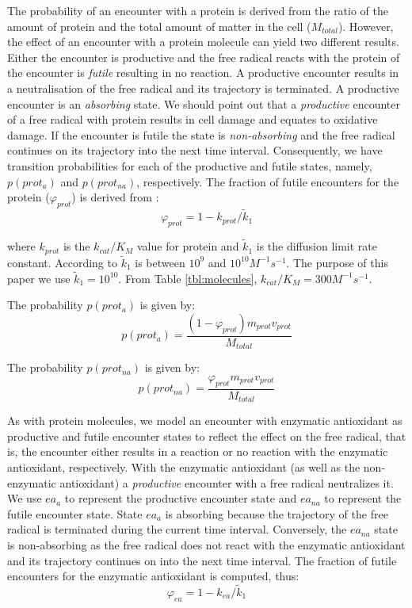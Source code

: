 \documentclass[preprint,12pt,authoryear]{elsarticle}
\begin{document}
The probability of an encounter with a protein is derived from the ratio
of the amount of protein and the total amount of matter in the cell ($M_{total}$).  
However, the effect of an encounter
with a protein molecule can yield two different results. Either the encounter is
productive and the free radical reacts with the protein of the encounter is \emph{futile}
resulting in no reaction.
A productive encounter results in a neutralisation of the
free radical  and its trajectory is terminated.
A productive encounter is an \emph{absorbing} state.
We should point out that a \emph{productive} encounter of a free radical with 
protein results in cell damage and equates to oxidative damage.
If the encounter is futile the state is \emph{non-absorbing}
and the free radical continues on its trajectory into the next time interval.
Consequently, we have transition probabilities for each of the productive and futile states, namely,
$p(prot_a)$ and $p(prot_{na})$, respectively.
The fraction of futile encounters for the protein ($\varphi_{prot}$) is derived from \citet{barevan:2015uy}:
%
\begin{equation}
\varphi_{prot} = 1 - k_{prot}/\tilde{k}_1
\end{equation}

{\parindent0pt
where $k_{prot}$ is the $k_{cat}/K_M$  value for protein 
and $\tilde{k}_1$ is the diffusion limit rate constant. According to 
\citet{barevan:2015uy} $\tilde{k}_1$ is between $10^{9}$ and $10^{10} M^{-1}s^{-1}$.
The purpose of this paper we use $\tilde{k}_1 = 10^{10}$.
From Table \ref{tbl:molecules},  $k_{cat}/K_M = 300 M^{-1}s^{-1}$.
}



%
The probability $p(prot_a)$ is given by:
%
\begin{equation}
p(prot_a) =  
\frac{ (1-\varphi_{prot}) m_{prot} v_{prot} } { M_{total } }
\end{equation}

The probability $p(prot_{na})$ is given by:
%
\begin{equation}
p(prot_{na}) = 
\frac{ \varphi_{prot} m_{prot} v_{prot} } { M_{total}  }
\end{equation}

As with protein molecules,
we model an encounter with enzymatic antioxidant as productive and futile encounter states to reflect the effect
on the free radical, that is, the encounter either results in a reaction or no reaction with the enzymatic antioxidant, respectively.
With the enzymatic antioxidant (as well as the non-enzymatic antioxidant) a \emph{productive} encounter with a free radical
neutralizes it.
We use $ea_{a}$ to represent the productive encounter state and $ea_{na}$ to represent the futile encounter state.
State $ea_a$ is absorbing because
the trajectory of the free radical is terminated during the current time interval.
Conversely, the $ea_{na}$ state is non-absorbing as the free radical does not react
with the enzymatic antioxidant and its trajectory continues on into the next time interval.
The fraction of futile encounters for the enzymatic antioxidant is computed, thus:
%
\begin{equation}
\varphi_{ea} = 1 - k_{ea}/\tilde{k}_1
\end{equation}
\end{document}
